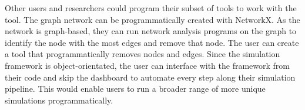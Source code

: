 Other users and researchers could program their subset of tools to work with the tool. 
The graph network can be programmatically created with NetworkX. 
As the network is graph-based, they can run network analysis programs on the graph to identify the node with the most edges and remove that node. 
The user can create a tool that programmatically removes nodes and edges. 
Since the simulation framework is object-orientated, the user can interface with the framework from their code and skip the dashboard to automate every step along their simulation pipeline. 
This would enable users to run a broader range of more unique simulations programmatically. 